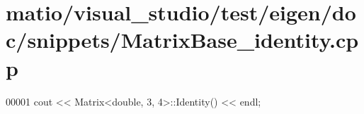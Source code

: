 \hypertarget{matio_2visual__studio_2test_2eigen_2doc_2snippets_2_matrix_base__identity_8cpp_source}{}\section{matio/visual\+\_\+studio/test/eigen/doc/snippets/\+Matrix\+Base\+\_\+identity.cpp}
\label{matio_2visual__studio_2test_2eigen_2doc_2snippets_2_matrix_base__identity_8cpp_source}

\begin{DoxyCode}
00001 cout << Matrix<double, 3, 4>::Identity() << endl;
\end{DoxyCode}
